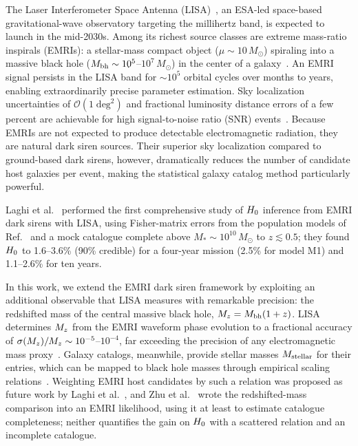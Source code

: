 The Laser Interferometer Space Antenna (LISA)~\cite{LISA:2024hlh}, an
ESA-led space-based gravitational-wave observatory targeting the
millihertz band, is expected to launch in the mid-2030s.  Among its
richest source classes are extreme mass-ratio inspirals (EMRIs): a
stellar-mass compact object ($\mu \sim 10\,M_\odot$) spiraling into a
massive black hole ($M_\mathrm{bh} \sim 10^5$--$10^7\,M_\odot$) in the center
of a galaxy~\cite{Babak:2017tow,LISA:2024hlh}.  An EMRI signal
persists in the LISA band for $\sim\!10^5$ orbital cycles over
months to years, enabling extraordinarily precise parameter estimation.
Sky localization uncertainties of $\mathcal{O}(1\;\mathrm{deg}^2)$
and fractional luminosity distance errors of a few percent are
achievable for high signal-to-noise ratio (SNR) events~\cite{Babak:2017tow}.
Because EMRIs are not expected to produce detectable electromagnetic
radiation, they are natural dark siren sources.  Their superior sky
localization compared to ground-based dark sirens, however, dramatically
reduces the number of candidate host galaxies per event, making the
statistical galaxy catalog method particularly powerful.

Laghi et al.~\cite{Laghi:2021pqk} performed the first comprehensive
study of $H_0$ inference from EMRI dark sirens with LISA, using
Fisher-matrix errors from the population models of
Ref.~\cite{Babak:2017tow} and a mock catalogue complete above
$M_* \sim 10^{10}\,M_\odot$ to $z \lesssim 0.5$; they found $H_0$ to
1.6--3.6\% (90\% credible) for a four-year mission (2.5\% for model M1)
and 1.1--2.6\% for ten years.

In this work, we extend the EMRI dark siren framework by exploiting an
additional observable that LISA measures with remarkable precision: the
redshifted mass of the central massive black hole, $M_z = M_\mathrm{bh}(1+z)$.
LISA determines $M_z$ from the EMRI waveform phase evolution to a
fractional accuracy of $\sigma(M_z)/M_z \sim 10^{-5}$--$10^{-4}$,
far exceeding the precision of any electromagnetic mass
proxy~\cite{Babak:2017tow}.  Galaxy catalogs, meanwhile, provide
stellar masses $M_\mathrm{stellar}$ for their entries, which can be mapped to
black hole masses through empirical scaling
relations~\cite{Reines:2015moa}.  Weighting EMRI host candidates by
such a relation was proposed as future work by Laghi
et al.~\cite[Sec.~6.4]{Laghi:2021pqk}, and Zhu
et al.~\cite{Zhu:2024qpp} wrote the redshifted-mass comparison into an
EMRI likelihood, using it at least to estimate catalogue completeness;
neither quantifies the gain on $H_0$ with a scattered relation and an
incomplete catalogue.

